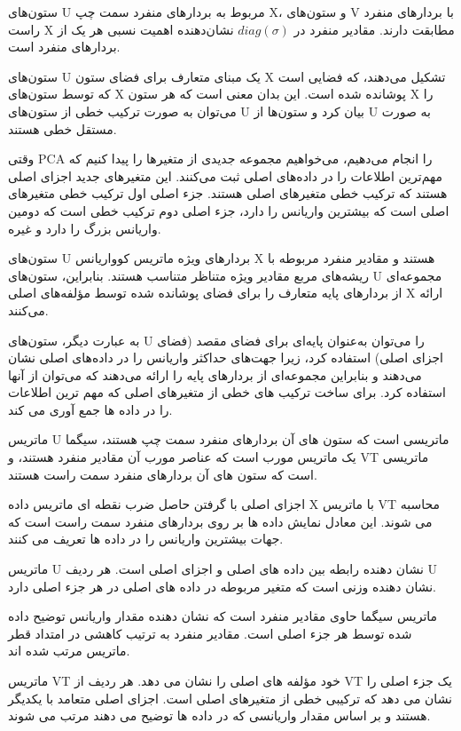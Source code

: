 ستون‌های U مربوط به بردارهای منفرد سمت چپ X، و ستون‌های V با بردارهای منفرد راست X مطابقت دارند. مقادیر منفرد در $diag(\sigma)$ نشان‌دهنده اهمیت نسبی هر یک از بردارهای منفرد است.

ستون‌های U یک مبنای متعارف برای فضای ستون X تشکیل می‌دهند، که فضایی است که توسط ستون‌های X پوشانده شده است. این بدان معنی است که هر ستون X را می‌توان به صورت ترکیب خطی از ستون‌های U بیان کرد و ستون‌ها از U به صورت مستقل خطی هستند.

وقتی PCA را انجام می‌دهیم، می‌خواهیم مجموعه جدیدی از متغیرها را پیدا کنیم که مهم‌ترین اطلاعات را در داده‌های اصلی ثبت می‌کنند. این متغیرهای جدید اجزای اصلی هستند که ترکیب خطی متغیرهای اصلی هستند. جزء اصلی اول ترکیب خطی متغیرهای اصلی است که بیشترین واریانس را دارد، جزء اصلی دوم ترکیب خطی است که دومین واریانس بزرگ را دارد و غیره.

ستون‌های U بردارهای ویژه ماتریس کوواریانس X هستند و مقادیر منفرد مربوطه با ریشه‌های مربع مقادیر ویژه متناظر متناسب هستند. بنابراین، ستون‌های U مجموعه‌ای از بردارهای پایه متعارف را برای فضای پوشانده شده توسط مؤلفه‌های اصلی X ارائه می‌کنند.

به عبارت دیگر، ستون‌های U را می‌توان به‌عنوان پایه‌ای برای فضای مقصد (فضای اجزای اصلی) استفاده کرد، زیرا جهت‌های حداکثر واریانس را در داده‌های اصلی نشان می‌دهند و بنابراین مجموعه‌ای از بردارهای پایه را ارائه می‌دهند که می‌توان از آنها استفاده کرد. برای ساخت ترکیب های خطی از متغیرهای اصلی که مهم ترین اطلاعات را در داده ها جمع آوری می کند.

 ماتریس U ماتریسی است که ستون های آن بردارهای منفرد سمت چپ هستند، سیگما یک ماتریس مورب است که عناصر مورب آن مقادیر منفرد هستند، و VT  ماتریسی است که ستون های آن بردارهای منفرد سمت راست هستند.

اجزای اصلی با گرفتن حاصل ضرب نقطه ای ماتریس داده X با ماتریس VT محاسبه می شوند. این معادل نمایش داده ها بر روی بردارهای منفرد سمت راست است که جهات بیشترین واریانس را در داده ها تعریف می کنند.

ماتریس U نشان دهنده رابطه بین داده های اصلی و اجزای اصلی است. هر ردیف U نشان دهنده وزنی است که متغیر مربوطه در داده های اصلی در هر جزء اصلی دارد.

ماتریس سیگما حاوی مقادیر منفرد است که نشان دهنده مقدار واریانس توضیح داده شده توسط هر جزء اصلی است. مقادیر منفرد به ترتیب کاهشی در امتداد قطر ماتریس مرتب شده اند.

ماتریس VT خود مؤلفه های اصلی را نشان می دهد. هر ردیف از VT یک جزء اصلی را نشان می دهد که ترکیبی خطی از متغیرهای اصلی است. اجزای اصلی متعامد با یکدیگر هستند و بر اساس مقدار واریانسی که در داده ها توضیح می دهند مرتب می شوند.


